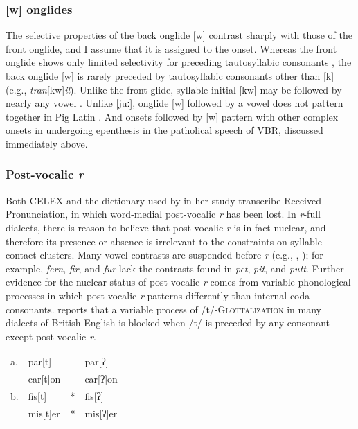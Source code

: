\subsubsection{[w] onglides}

The selective properties of the back onglide [w] contrast sharply with those of the front onglide, and I assume that it is assigned to the onset. Whereas the front onglide shows only limited selectivity for preceding tautosyllabic consonants \citep{Davis1995,Kaye1996}, the back onglide [w] is rarely preceded by tautosyllabic consonants other than [k] (e.g., \emph{tran}[kw]\emph{il}). Unlike the front glide, syllable-initial [kw] may be followed by nearly any vowel \citep[][161]{Davis1995}. Unlike [juː], onglide [w] followed by a vowel does not pattern together in Pig Latin \citep[][166]{Davis1995}. And onsets followed by [w] pattern with other complex onsets in undergoing epenthesis in the patholical speech of VBR, discussed immediately above.

\subsubsection{Post-vocalic \emph{r}}

Both CELEX and the dictionary used by \citet{Pierrehumbert1994} in her study transcribe Received Pronunciation, in which word-medial post-vocalic \emph{r} has been lost. In \emph{r}-full dialects, there is reason to believe that post-vocalic \emph{r} is in fact nuclear, and therefore its presence or absence is irrelevant to the constraints on syllable contact clusters. Many vowel contrasts are suspended before \emph{r} (e.g., \citealt[269f.]{Fudge1969}, \citealt[][255]{Harris1994}); for example, \emph{fern}, \emph{fir}, and \emph{fur} lack the contrasts found in \emph{pet}, \emph{pit}, and \emph{putt}. Further evidence for the nuclear status of post-vocalic \emph{r} comes from variable phonological processes in which post-vocalic \emph{r} patterns differently than internal coda consonants. \citeauthor{Harris1994} reports that a variable process of /t/-\textsc{Glottalization} in many dialects of British English is blocked when /t/ is preceded by any consonant except post-vocalic \emph{r}.

\begin{example}
\begin{tabular}{l l l@{} l}
a. & par[t]   &   & par[ʔ]   \\
   & car[t]on &   & car[ʔ]on \\
b. & fis[t]   & * & fis[ʔ]   \\
   & mis[t]er & * & mis[ʔ]er \\
\end{tabular}
\end{example}

